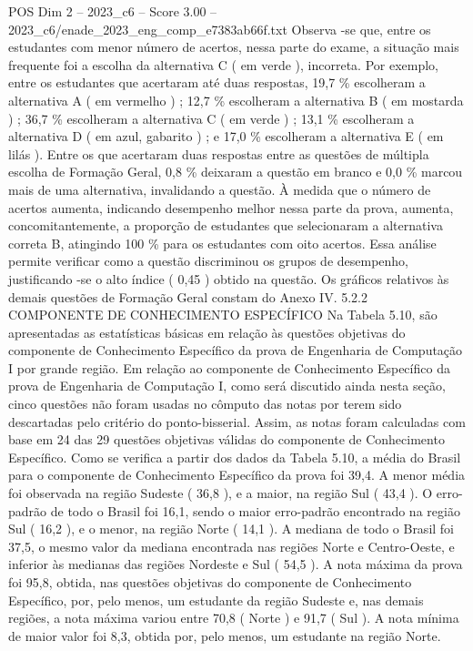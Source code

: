 \begin{textsample}{POS Dim 2 – 2023\_c6 – Score 3.00 – 2023\_c6/enade\_2023\_eng\_comp\_e7383ab66f.txt}
Observa -se que, entre os estudantes com menor número de acertos, nessa parte do exame, a situação mais frequente foi a escolha da alternativa C ( em verde ), incorreta.
Por exemplo, entre os estudantes que acertaram até duas respostas, 19,7 \% escolheram a alternativa A ( em vermelho ) ; 12,7 \% escolheram a alternativa B ( em mostarda ) ; 36,7 \% escolheram a alternativa C ( em verde ) ; 13,1 \% escolheram a alternativa D ( em azul, gabarito ) ; e 17,0 \% escolheram a alternativa E ( em lilás ).
Entre os que acertaram duas respostas entre as questões de múltipla escolha de Formação Geral, 0,8 \% deixaram a questão em branco e 0,0 \% marcou mais de uma alternativa, invalidando a questão.
À medida que o número de acertos aumenta, indicando desempenho melhor nessa parte da prova, aumenta, concomitantemente, a proporção de estudantes que selecionaram a alternativa correta B, atingindo 100 \% para os estudantes com oito acertos.
Essa análise permite verificar como a questão discriminou os grupos de desempenho, justificando -se o alto índice ( 0,45 ) obtido na questão.
Os gráficos relativos às demais questões de Formação Geral constam do Anexo IV. 5.2.2 COMPONENTE DE CONHECIMENTO ESPECÍFICO Na Tabela 5.10, são apresentadas as estatísticas básicas em relação às questões objetivas do componente de Conhecimento Específico da prova de Engenharia de Computação I por grande região.
Em relação ao componente de Conhecimento Específico da prova de Engenharia de Computação I, como será discutido ainda nesta seção, cinco questões não foram usadas no cômputo das notas por terem sido descartadas pelo critério do ponto-bisserial.
Assim, as notas foram calculadas com base em 24 das 29 questões objetivas válidas do componente de Conhecimento Específico.
Como se verifica a partir dos dados da Tabela 5.10, a média do Brasil para o componente de Conhecimento Específico da prova foi 39,4.
A menor média foi observada na região Sudeste ( 36,8 ), e a maior, na região Sul ( 43,4 ).
O erro-padrão de todo o Brasil foi 16,1, sendo o maior erro-padrão encontrado na região Sul ( 16,2 ), e o menor, na região Norte ( 14,1 ).
A mediana de todo o Brasil foi 37,5, o mesmo valor da mediana encontrada nas regiões Norte e Centro-Oeste, e inferior às medianas das regiões Nordeste e Sul ( 54,5 ).
A nota máxima da prova foi 95,8, obtida, nas questões objetivas do componente de Conhecimento Específico, por, pelo menos, um estudante da região Sudeste e, nas demais regiões, a nota máxima variou entre 70,8 ( Norte ) e 91,7 ( Sul ).
A nota mínima de maior valor foi 8,3, obtida por, pelo menos, um estudante na região Norte.

\end{textsample}
